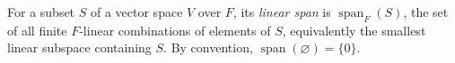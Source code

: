 
For a subset $S$ of a vector space $V$ over $F$, its \emph{linear span} is $\operatorname{span}_F(S)$, the set of all finite $F$-linear combinations of elements of $S$, equivalently the smallest linear subspace containing $S$. By convention, $\operatorname{span}(\varnothing)=\{0\}$.

